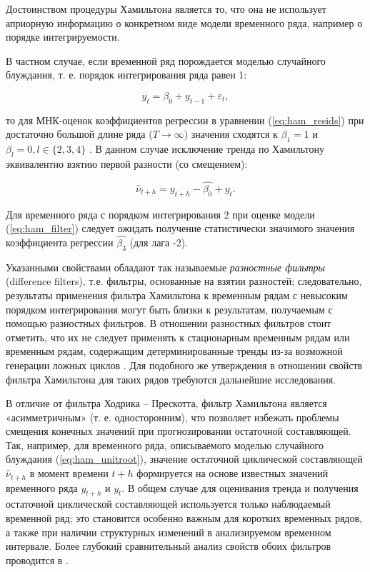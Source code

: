 \documentclass[a4paper,14pt]{extreport}
\begin{document}
	Достоинством процедуры Хамильтона является то, что она не использует априорную информацию о конкретном виде модели временного ряда, например о порядке интегрируемости. 
	
	В частном случае, если временной ряд порождается моделью случайного блуждания, т. е. порядок интегрирования ряда равен 1: 
	
	\begin{equation}
		y_t = \beta_0 + y_{t-1} + \varepsilon_t ,
		\label{eq:ham_unitroot}
	\end{equation}
	
	то для МНК-оценок коэффициентов регрессии в уравнении (\ref{eq:ham_resids}) при достаточно большой длине ряда ($T \rightarrow \infty$) значения сходятся к $\beta_1 = 1$ и $\beta_l = 0, l \in \{2, 3, 4\}$ \cite[с. 16-17]{hamHP}. В данном случае исключение тренда по Хамильтону эквивалентно взятию первой разности (со смещением):
	
	\begin{equation}
		\hat{\nu}_{t+h} = y_{t+h} - \hat{\beta_0} + y_{t} .
		\label{eq:ham_unitroot_resid}
	\end{equation}
	
	Для временного ряда с порядком интегрирования 2 при оценке модели (\ref{eq:ham_filter}) следует ожидать получение статистически значимого значения коэффициента регрессии $\hat{\beta_3}$  (для лага -2).  
	
	Указанными свойствами обладают так называемые \textit{разностные фильтры} (difference filters), т.\:е. фильтры, основанные на взятии разностей; следовательно, результаты применения фильтра Хамильтона к временным рядам с невысоким порядком интегрирования могут быть близки к результатам, получаемым с помощью разностных фильтров. В отношении разностных фильтров стоит отметить, что их не следует применять к стационарным временным рядам или временным рядам, содержащим детерминированные тренды из-за возможной генерации ложных циклов \cite{schuler_detrend, harvey_detrend}. Для подобного же утверждения в отношении свойств фильтра Хамильтона для таких рядов требуются дальнейшие исследования. 
	
	В отличие от фильтра Ходрика -- Прескотта, фильтр Хамильтона является «асимметричным» (т. е. односторонним), что позволяет избежать проблемы смещения конечных значений при прогнозировании остаточной составляющей. Так, например, для временного ряда, описываемого моделью случайного блуждания (\ref{eq:ham_unitroot}),  значение остаточной циклической составляющей $\hat{\nu}_{t+h}$ в момент времени $t+h$ формируется на основе известных значений временного ряда $y_{t+h}$ и $y_t$. В общем случае для оценивания тренда и получения остаточной циклической составляющей используется только наблюдаемый временной ряд; это становится особенно важным для коротких временных рядов, а также при наличии структурных изменений в анализируемом временном интервале. Более глубокий сравнительный анализ свойств обоих фильтров проводится в \cite{schuler_detrend}.
	
\end{document}
